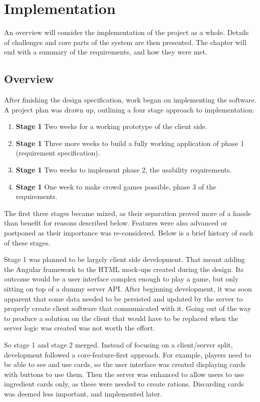 \chapter{Implementation}
An overview will consider the implementation of the project as a whole. Details of challenges and core parts of the system are then presented. The chapter will end with a summary of the requirements, and how they were met.

\section{Overview}
After finishing the design specification, work began on implementing the software. A project plan was drawn up, outlining a four stage approach to implementation:

\begin{enumerate}
	\item \textbf{Stage 1} Two weeks for a working prototype of the client side.
	\item \textbf{Stage 1} Three more weeks to build a fully working application of phase 1 (requirement specification).
	\item \textbf{Stage 1} Two weeks to implement phase 2, the usability requirements.
	\item \textbf{Stage 1} One week to make crowd games possible, phase 3 of the requirements.
\end{enumerate}

The first three stages became mixed, as their separation proved more of a hassle than benefit for reasons described below. Features were also advanced or postponed as their importance was re-considered. Below is a brief history of each of these stages.

Stage 1 was planned to be largely client side development. That meant adding the Angular framework to the HTML mock-ups created during the design. Its outcome would be a user interface complex enough to play a game, but only sitting on top of a dummy server API. After beginning development, it was soon apparent that some data needed to be persisted and updated by the server to properly create client software that communicated with it. Going out of the way to produce a solution on the client that would have to be replaced when the server logic was created was not worth the effort.

So stage 1 and stage 2 merged. Instead of focusing on a client/server split, development followed a core-feature-first approach. For example, players need to be able to see and use cards, so the user interface was created displaying cards with buttons to use them. Then the server was enhanced to allow users to use ingredient cards only, as these were needed to create rations. Discarding cards was deemed less important, and implemented later.

